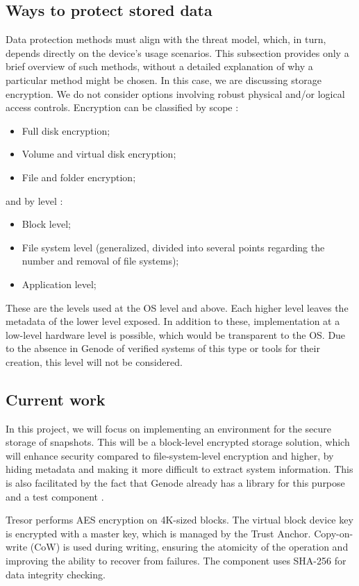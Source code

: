 \subsection{Ways to protect stored data}

Data protection methods must align with the threat model, which, in turn, depends directly on the device’s usage scenarios. This subsection provides only a brief overview of such methods, without a detailed explanation of why a particular method might be chosen.
In this case, we are discussing storage encryption. We do not consider options involving robust physical and/or logical access controls. Encryption can be classified by scope \cite{NIST_SP800111}:
\begin{itemize}
    \item Full disk encryption;
    \item Volume and virtual disk encryption;
    \item File and folder encryption;
\end{itemize}
and by level \cite{CryptoFS}:
\begin{itemize}
    \item Block level;
    \item File system level (generalized, divided into several points regarding the number and removal of file systems);
    \item Application level;
\end{itemize}
These are the levels used at the OS level and above. Each higher level leaves the metadata of the lower level exposed. In addition to these, implementation at a low-level hardware level is possible, which would be transparent to the OS. Due to the absence in Genode of verified systems of this type or tools for their creation, this level will not be considered.

\subsection{Current work}

In this project, we will focus on implementing an environment for the secure storage of snapshots. This will be a block-level encrypted storage solution, which will enhance security compared to file-system-level encryption and higher, by hiding metadata and making it more difficult to extract system information. This is also facilitated by the fact that Genode already has a library \cite{GitHub_tresor} for this purpose and a test component \cite{GitHub_file_vault, Page_file_vault}. 

Tresor performs AES encryption on 4K-sized blocks. The virtual block device key is encrypted with a master key, which is managed by the Trust Anchor. Copy-on-write (CoW) is used during writing, ensuring the atomicity of the operation and improving the ability to recover from failures. The component uses SHA-256 for data integrity checking.
